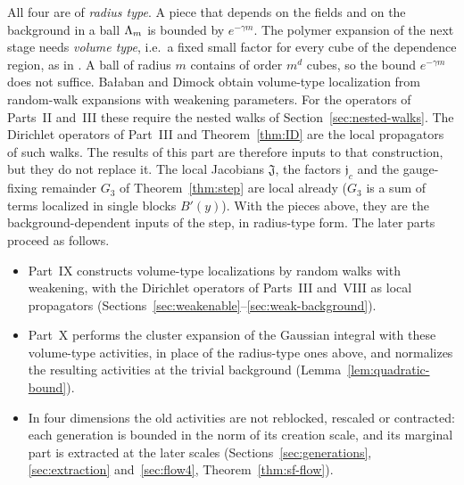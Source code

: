 All four are of \emph{radius type}. A piece that depends on the fields and on the background in a ball $\Lambda_m$ is bounded by $e^{-\gamma m}$. The polymer expansion of the next stage needs \emph{volume type}, i.e.\ a fixed small factor for every cube of the dependence region, as in \cite[(116)--(122)]{DimockI}. A ball of radius $m$ contains of order $m^d$ cubes, so the bound $e^{-\gamma m}$ does not suffice. Ba\l aban and Dimock obtain volume-type localization from random-walk expansions with weakening parameters. For the operators of Parts~II and~III these require the nested walks of Section~\ref{sec:nested-walks}. The Dirichlet operators of Part~III and Theorem~\ref{thm:ID} are the local propagators of such walks. The results of this part are therefore inputs to that construction, but they do not replace it.
The local Jacobians $\mathfrak J$, the factors $\mathfrak j_c$ and the gauge-fixing remainder $G_3$ of Theorem~\ref{thm:step} are local already ($G_3$ is a sum of terms localized in single blocks $B'(y)$). With the pieces above, they are the background-dependent inputs of the step, in radius-type form. The later parts proceed as follows.
\begin{itemize}
\item Part~IX constructs volume-type localizations by random walks with weakening, with the Dirichlet operators of Parts~III and~VIII as local propagators (Sections~\ref{sec:weakenable}--\ref{sec:weak-background}).
\item Part~X performs the cluster expansion of the Gaussian integral with these volume-type activities, in place of the radius-type ones above, and normalizes the resulting activities at the trivial background (Lemma~\ref{lem:quadratic-bound}).
\item In four dimensions the old activities are not reblocked, rescaled or contracted: each generation is bounded in the norm of its creation scale, and its marginal part is extracted at the later scales (Sections~\ref{sec:generations}, \ref{sec:extraction} and~\ref{sec:flow4}, Theorem~\ref{thm:sf-flow}).
\end{itemize}
